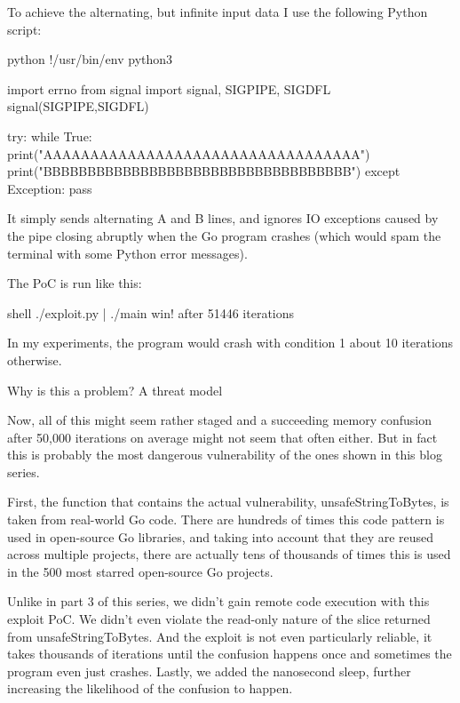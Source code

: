         To achieve the alternating, but infinite input data I use the following Python script:

        python
        !/usr/bin/env python3

        import errno
        from signal import signal, SIGPIPE, SIGDFL
        signal(SIGPIPE,SIGDFL)

        try:
        while True:
        print("AAAAAAAAAAAAAAAAAAAAAAAAAAAAAAAAAA")
        print("BBBBBBBBBBBBBBBBBBBBBBBBBBBBBBBBBBB")
        except Exception:
        pass


        It simply sends alternating A and B lines, and ignores IO exceptions caused by the pipe closing abruptly when the
        Go program crashes (which would spam the terminal with some Python error messages).

        The PoC is run like this:

        shell
        ./exploit.py | ./main
        win! after 51446 iterations


        In my experiments, the program would crash with condition 1 about 10%
        iterations otherwise.


        Why is this a problem? A threat model

        Now, all of this might seem rather staged and a succeeding memory confusion after 50,000 iterations on average might not
        seem that often either. But in fact this is probably the most dangerous vulnerability of the ones shown in this blog
        series.

        First, the function that contains the actual vulnerability, unsafeStringToBytes, is taken from real-world Go code.
        There are hundreds of times this code pattern is used in open-source Go libraries, and taking into account that they
        are reused across multiple projects, there are actually tens of thousands of times this is used in the 500 most starred
        open-source Go projects.

        Unlike in part 3 of this series, we didn't gain remote code execution with this exploit PoC. We didn't even violate the
        read-only nature of the slice returned from unsafeStringToBytes. And the exploit is not even particularly reliable, it
        takes thousands of iterations until the confusion happens once and sometimes the program even just crashes. Lastly, we
        added the nanosecond sleep, further increasing the likelihood of the confusion to happen.

